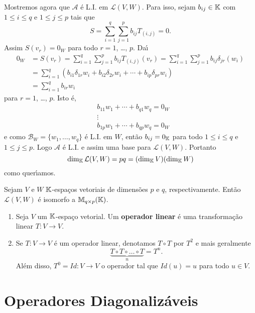 \begin{prova}
	Mostremos agora que $\mathcal{A}$ \'e L.I. em $\mathcal{L}(V,W)$. Para isso, sejam $b_{ij} \in \mathbb{K}$ com $1 \le i \le q$ e $1 \le j \le p$ tais que
	\[
		S = \sum_{i = 1}^q\sum_{j = 1}^pb_{ij}T_{(i,j)} = 0.
	\]
	Assim $S(v_r) = 0_W$ para todo $r = 1$, \dots, $p$. Da{\'\i}
	\begin{align*}
		0_W &= S(v_r) = \sum_{i = 1}^q\sum_{j = 1}^pb_{ij}T_{(i,j)}(v_r) = \sum_{i = 1}^q\sum_{j = 1}^pb_{ij}\delta_{jr}(w_i)\\ &= \sum_{i = 1}^q(b_{i1}\delta_{1r}w_i + b_{i2}\delta_{2r}w_i + \cdots + b_{ip}\delta_{pr}w_i)\\ &= \sum_{i = 1}^qb_{ir}w_i
	\end{align*}
	para $r = 1$, \dots, $p$. Isto \'e,
	\begin{align*}
		&b_{11}w_1 + \cdots + b_{q1}w_q = 0_W\\
		&\vdots\\
		&b_{1p}w_1 + \cdots + b_{qp}w_q = 0_W
	\end{align*}
	e como $\mathcal{B}_W = \{w_1,\dots,w_q\}$ \'e L.I. em $W$, ent\~ao $b_{ij} = 0_{\mathbb{K}}$ para todo $1 \le i \le q$ e $1 \le j \le p$. Logo $\mathcal{A}$ \'e L.I. e assim uma base para $\mathcal{L}(V,W)$. Portanto
	\[
		\dim_{\mathbb{K}}\mathcal{L}(V,W) = pq = (\dim_{\mathbb{K}}V)(\dim_{\mathbb{K}}W)
	\]
	como quer{\'\i}amos.
\end{prova}

\begin{corolario}
	Sejam $V$ e $W$ $\mathbb{K}$-espa\c{c}os vetoriais de dimens\~oes $p$ e $q$, respectivamente. Ent\~ao $\mathcal{L}(V,W)$ \'e isomorfo a $\mathbb{M}_{q\times p}(\mathbb{K})$.
\end{corolario}

\begin{definicao}
	\begin{enumerate}[label={\roman*})]
		\item Seja $V$ um $\mathbb{K}$-espa\c{c}o vetorial. Um \textbf{operador linear} \'e uma transforma\c{c}\~ao linear $T : V \to V$.
		\item Se $T : V \to V$ \'e um operador linear, denotamos $T \circ T$ por $T^2$ e mais geralmente
		\[
			\underbrace{T \circ T \circ \dots \circ T}_{n} = T^n.
		\]
		Al\'em disso, $T^0 = Id : V \to V$ o operador tal que $Id(u) = u$ para todo $u \in V$.
	\end{enumerate}
\end{definicao}

\section{Operadores Diagonaliz\'aveis} %
\label{sec:operadores_diagonalizaveis}

